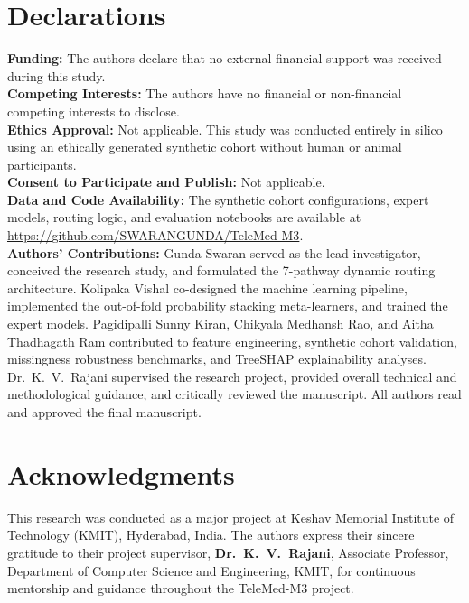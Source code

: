 \documentclass[10pt,twocolumn,letterpaper]{article}
\begin{document}
\section*{Declarations}
{\small
\noindent\textbf{Funding:} The authors declare that no external financial support was received during this study. \\
\textbf{Competing Interests:} The authors have no financial or non-financial competing interests to disclose. \\
\textbf{Ethics Approval:} Not applicable. This study was conducted entirely in silico using an ethically generated synthetic cohort without human or animal participants. \\
\textbf{Consent to Participate and Publish:} Not applicable. \\
\textbf{Data and Code Availability:} The synthetic cohort configurations, expert models, routing logic, and evaluation notebooks are available at \url{https://github.com/SWARANGUNDA/TeleMed-M3}. \\
\textbf{Authors' Contributions:} Gunda Swaran served as the lead investigator, conceived the research study, and formulated the 7-pathway dynamic routing architecture. Kolipaka Vishal co-designed the machine learning pipeline, implemented the out-of-fold probability stacking meta-learners, and trained the expert models. Pagidipalli Sunny Kiran, Chikyala Medhansh Rao, and Aitha Thadhagath Ram contributed to feature engineering, synthetic cohort validation, missingness robustness benchmarks, and TreeSHAP explainability analyses. Dr.~K.~V.~Rajani supervised the research project, provided overall technical and methodological guidance, and critically reviewed the manuscript. All authors read and approved the final manuscript.
}

\section*{Acknowledgments}
{\small
This research was conducted as a major project at Keshav Memorial Institute of Technology (KMIT), Hyderabad, India. The authors express their sincere gratitude to their project supervisor, \textbf{Dr.~K.~V.~Rajani}, Associate Professor, Department of Computer Science and Engineering, KMIT, for continuous mentorship and guidance throughout the TeleMed-M3 project.
}

\balance
\begingroup
\footnotesize
\setlength{\bibsep}{1.0pt plus 0.3pt minus 0.2pt}


\endgroup
\end{document}
